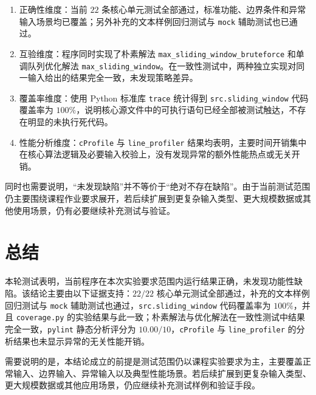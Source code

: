 \documentclass[a4paper,UTF8,fontset=none]{ctexart}
\begin{document}
\begin{enumerate}
    \item 正确性维度：当前 $22$ 条核心单元测试全部通过，标准功能、边界条件和异常输入场景均已覆盖；另外补充的文本样例回归测试与 \texttt{mock} 辅助测试也已通过。
    \item 互验维度：程序同时实现了朴素解法 \texttt{max\_sliding\_window\_bruteforce} 和单调队列优化解法 \texttt{max\_sliding\_window}。在一致性测试中，两种独立实现对同一输入给出的结果完全一致，未发现策略差异。
    \item 覆盖率维度：使用 Python 标准库 \texttt{trace} 统计得到 \texttt{src.sliding\_window} 代码覆盖率为 $100\%$，说明核心源文件中的可执行语句已经全部被测试触达，不存在明显的未执行死代码。
    \item 性能分析维度：\texttt{cProfile} 与 \texttt{line\_profiler} 结果均表明，主要时间开销集中在核心算法逻辑及必要输入校验上，没有发现异常的额外性能热点或无关开销。
\end{enumerate}

同时也需要说明，“未发现缺陷”并不等价于“绝对不存在缺陷”。由于当前测试范围仍主要围绕课程作业要求展开，若后续扩展到更复杂输入类型、更大规模数据或其他使用场景，仍有必要继续补充测试与验证。

\section{总结}

本轮测试表明，当前程序在本次实验要求范围内运行结果正确，未发现功能性缺陷。该结论主要由以下证据支持：$22/22$ 核心单元测试全部通过，补充的文本样例回归测试与 \texttt{mock} 辅助测试也通过，\texttt{src.sliding\_window} 代码覆盖率为 $100\%$，并且 \texttt{coverage.py} 的实验结果与此一致；朴素解法与优化解法在一致性测试中结果完全一致，\texttt{pylint} 静态分析评分为 $10.00/10$，\texttt{cProfile} 与 \texttt{line\_profiler} 的分析结果也未显示异常的无关性能开销。

需要说明的是，本结论成立的前提是测试范围仍以课程实验要求为主，主要覆盖正常输入、边界输入、异常输入以及典型性能场景。若后续扩展到更复杂输入类型、更大规模数据或其他应用场景，仍应继续补充测试样例和验证手段。
\end{document}
